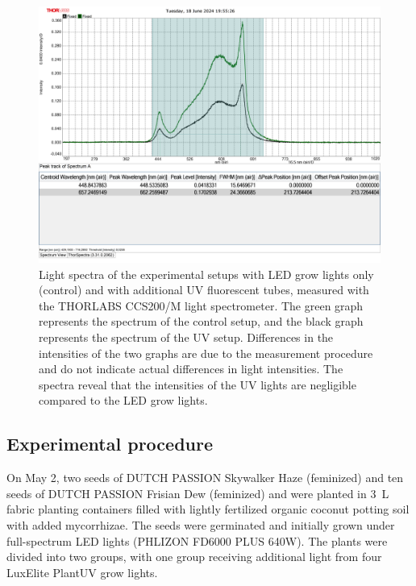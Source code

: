 \begin{figure}[htbp]
    \includegraphics[width=\linewidth]{spectra_uv_and_ctrl}
    \caption[Light spectra of the experimental setups]{Light spectra of the experimental setups with LED grow lights only (control) and with additional UV fluorescent tubes, measured with the THORLABS CCS200/M light spectrometer. The green graph represents the spectrum of the control setup, and the black graph represents the spectrum of the UV setup. Differences in the intensities of the two graphs are due to the measurement procedure and do not indicate actual differences in light intensities. The spectra reveal that the intensities of the UV lights are negligible compared to the LED grow lights.}
    \label{fig:spectra_uv_and_ctrl}
\end{figure}

\subsection{Experimental procedure}

On May 2, two seeds of DUTCH PASSION Skywalker Haze (feminized) and ten seeds of DUTCH PASSION Frisian Dew (feminized) and  were planted in \qty[mode=text]{3}{\L} fabric planting containers filled with lightly fertilized organic coconut potting soil with added mycorrhizae. The seeds were germinated and initially grown under full-spectrum LED lights (PHLIZON FD6000 PLUS 640W). The plants were divided into two groups, with one group receiving additional light from four LuxElite PlantUV grow lights.

